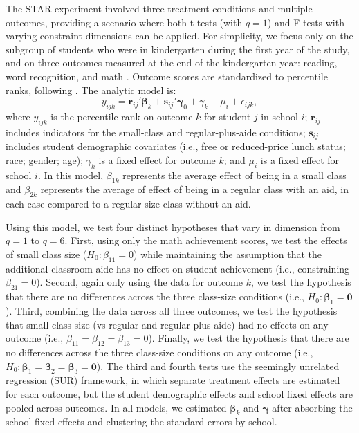 \documentclass[draft]{ectaart}\usepackage[]{graphicx}\usepackage[]{color}
\newcommand{\bm}{\mathbf}
\newcommand{\bs}{\boldsymbol}
\begin{document}
The STAR experiment involved three treatment conditions and multiple outcomes, providing a scenario where both t-tests (with $q = 1$) and F-tests with varying constraint dimensions can be applied. 
For simplicity, we focus only on the subgroup of students who were in kindergarten during the first year of the study, and on three outcomes measured at the end of the kindergarten year: reading, word recognition, and math \citep{Achilles2008tennessee}. 
Outcome scores are standardized to percentile ranks, following \citet{Krueger2001effect}.
The analytic model is: 
\begin{equation}
y_{ijk} = \bm{r}_{ij}'\bs\beta_k + \bm{s}_{ij}'\bs\gamma_0 + \gamma_k + \mu_i + \epsilon_{ijk}, 
\end{equation}
where $y_{ijk}$ is the percentile rank on outcome $k$ for student $j$ in school $i$; $\bm{r}_{ij}$ includes indicators for the small-class and regular-plus-aide conditions; $\bm{s}_{ij}$ includes student demographic covariates (i.e., free or reduced-price lunch status; race; gender; age); $\gamma_k$ is a fixed effect for outcome $k$; and $\mu_i$ is a fixed effect for school $i$. 
In this model, $\beta_{1k}$ represents the average effect of being in a small class and $\beta_{2k}$ represents the average of effect of being in a regular class with an aid, in each case compared to a regular-size class without an aid.

Using this model, we test four distinct hypotheses that vary in dimension from $q = 1$ to $q = 6$. 
First, using only the math achievement scores, we test the effects of small class size ($H_0: \beta_{11} = 0$) while maintaining the assumption that the additional classroom aide has no effect on student achievement (i.e., constraining $\beta_{21} = 0$). 
Second, again only using the data for outcome $k$, we test the hypothesis that there are no differences across the three class-size conditions (i.e., $H_0: \bs\beta_1 = \bm{0}$). 
Third, combining the data across all three outcomes, we test the hypothesis that small class size (vs regular and regular plus aide) had no effects on any outcome (i.e., $\beta_{11} = \beta_{12} = \beta_{13} = 0$).
Finally, we test the hypothesis that there are no differences across the three class-size conditions on any outcome (i.e., $H_0: \bs\beta_1 = \bs\beta_2 = \bs\beta_3 = \bm{0}$). 
The third and fourth tests use the seemingly unrelated regression (SUR) framework, in which separate treatment effects are estimated for each outcome, but the student demographic effects and school fixed effects are pooled across outcomes. 
In all models, we estimated $\bs\beta_k$ and $\bs\gamma$ after absorbing the school fixed effects and clustering the standard errors by school.
\end{document}
